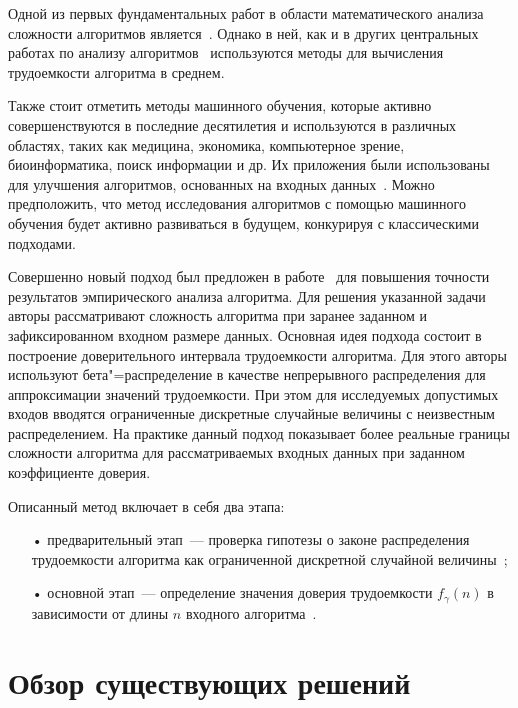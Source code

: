 \documentclass[a4paper, article, 14pt]{extarticle}
\begin{document}
Одной из первых фундаментальных работ в области математического анализа сложности алгоритмов является~\cite{knuth}. Однако в ней, как и в других центральных работах по анализу алгоритмов~\cite{cormen, wegener, juraj} используются методы для вычисления трудоемкости алгоритма в среднем.

Также стоит отметить методы машинного обучения, которые активно совершенствуются в последние десятилетия и используются в различных областях, таких как медицина, экономика, компьютерное зрение, биоинформатика, поиск информации и др. Их приложения были использованы для улучшения алгоритмов, основанных на входных данных~\cite{berube, runtime_prediction, intelligence_forecasting}. Можно предположить, что метод исследования алгоритмов с помощью машинного обучения будет активно развиваться в будущем, конкурируя с классическими подходами.

Совершенно новый подход был предложен в работе~\cite{petrushyn_ulyanov_analysis} для повышения точности результатов эмпирического анализа алгоритма. Для решения указанной задачи авторы рассматривают сложность алгоритма при заранее заданном и зафиксированном входном размере данных. Основная идея подхода состоит в построение доверительного интервала трудоемкости алгоритма. Для этого авторы используют бета"=распределение в качестве непрерывного распределения для аппроксимации значений трудоемкости. При этом для исследуемых допустимых входов вводятся ограниченные дискретные случайные величины с неизвестным распределением. На практике данный подход показывает более реальные границы сложности алгоритма для рассматриваемых входных данных при заданном коэффициенте доверия.

Описанный метод включает в себя два этапа:

\begin{enumerate}
	\item[•] предварительный этап~--- проверка гипотезы о законе распределения трудоемкости алгоритма как ограниченной дискретной случайной величины~\cite{petrushyn_ulyanov_planning};

	\item[•] основной этап~--- определение значения доверия трудоемкости $f_\gamma(n)$ в зависимости от длины $n$ входного алгоритма~\cite{petrushyn_ulyanov_analysis}.
\end{enumerate}

\section{Обзор существующих решений}\label{sec:exisiting_solutions_review}
\end{document}
